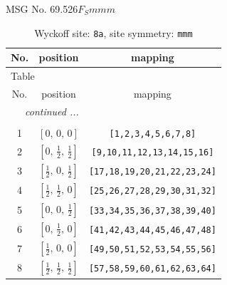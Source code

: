 \documentclass[fleqn,8pt]{jsarticle}
\begin{document}
\setcounter{MaxMatrixCols}{32}

\renewcommand{\tablename}{Table~}
\renewcommand{\figurename}{Figure~}
\begin{center}
\LARGE
MSG No. 69.526\quad$F_{S}mmm$
\end{center}
\renewcommand{\arraystretch}{1.2}
\begin{longtable}{ccc}
\caption{Wyckoff site: {\tt 8a}, site symmetry: {\tt mmm}}
 \\
 \hline \hline
No. & position & mapping \\ \hline \endfirsthead

\multicolumn{2}{l}{\tablename\ \thetable{}} \\
 \hline \hline
No. & position & mapping \\ \hline \endhead

 \hline \hline
\multicolumn{2}{r}{\footnotesize\it continued ...} \\ \endfoot

 \hline \hline
\multicolumn{2}{r}{} \\ \endlastfoot

1 & $\left[ 0,\, 0,\, 0 \right]$ & {\tt [1,2,3,4,5,6,7,8]} \\ \hline
2 & $\left[ 0,\, \frac{1}{2},\, \frac{1}{2} \right]$ & {\tt [9,10,11,12,13,14,15,16]} \\ \hline
3 & $\left[ \frac{1}{2},\, 0,\, \frac{1}{2} \right]$ & {\tt [17,18,19,20,21,22,23,24]} \\ \hline
4 & $\left[ \frac{1}{2},\, \frac{1}{2},\, 0 \right]$ & {\tt [25,26,27,28,29,30,31,32]} \\ \hline
5 & $\left[ 0,\, 0,\, \frac{1}{2} \right]$ & {\tt [33,34,35,36,37,38,39,40]} \\ \hline
6 & $\left[ 0,\, \frac{1}{2},\, 0 \right]$ & {\tt [41,42,43,44,45,46,47,48]} \\ \hline
7 & $\left[ \frac{1}{2},\, 0,\, 0 \right]$ & {\tt [49,50,51,52,53,54,55,56]} \\ \hline
8 & $\left[ \frac{1}{2},\, \frac{1}{2},\, \frac{1}{2} \right]$ & {\tt [57,58,59,60,61,62,63,64]} \\
\end{longtable}
\renewcommand{\arraystretch}{1.2}
\end{document}
